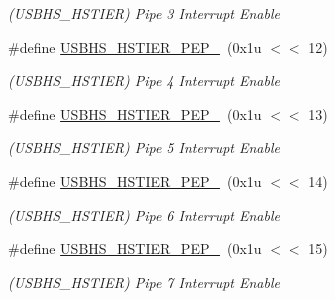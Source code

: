\begin{DoxyCompactItemize}
\begin{DoxyCompactList}\small\item\em (U\+S\+B\+H\+S\+\_\+\+H\+S\+T\+I\+ER) Pipe 3 Interrupt Enable \end{DoxyCompactList}\item 
\mbox{\label{group__SAMV71__USBHS_ga6c132fc69c3337e6671990fd1a7e991a}} 
\#define \mbox{\hyperlink{group__SAMV71__USBHS_ga6c132fc69c3337e6671990fd1a7e991a}{U\+S\+B\+H\+S\+\_\+\+H\+S\+T\+I\+E\+R\+\_\+\+P\+E\+P\+\_}}~(0x1u $<$$<$ 12)
\begin{DoxyCompactList}\small\item\em (U\+S\+B\+H\+S\+\_\+\+H\+S\+T\+I\+ER) Pipe 4 Interrupt Enable \end{DoxyCompactList}\item 
\mbox{\label{group__SAMV71__USBHS_ga6b87a486fa83e0611c5a4eb9d501f7b3}} 
\#define \mbox{\hyperlink{group__SAMV71__USBHS_ga6b87a486fa83e0611c5a4eb9d501f7b3}{U\+S\+B\+H\+S\+\_\+\+H\+S\+T\+I\+E\+R\+\_\+\+P\+E\+P\+\_}}~(0x1u $<$$<$ 13)
\begin{DoxyCompactList}\small\item\em (U\+S\+B\+H\+S\+\_\+\+H\+S\+T\+I\+ER) Pipe 5 Interrupt Enable \end{DoxyCompactList}\item 
\mbox{\label{group__SAMV71__USBHS_ga5e1680335266b023196d8eec97400876}} 
\#define \mbox{\hyperlink{group__SAMV71__USBHS_ga5e1680335266b023196d8eec97400876}{U\+S\+B\+H\+S\+\_\+\+H\+S\+T\+I\+E\+R\+\_\+\+P\+E\+P\+\_}}~(0x1u $<$$<$ 14)
\begin{DoxyCompactList}\small\item\em (U\+S\+B\+H\+S\+\_\+\+H\+S\+T\+I\+ER) Pipe 6 Interrupt Enable \end{DoxyCompactList}\item 
\mbox{\label{group__SAMV71__USBHS_ga788ce64d2afdf12459e1d2ae8899323d}} 
\#define \mbox{\hyperlink{group__SAMV71__USBHS_ga788ce64d2afdf12459e1d2ae8899323d}{U\+S\+B\+H\+S\+\_\+\+H\+S\+T\+I\+E\+R\+\_\+\+P\+E\+P\+\_}}~(0x1u $<$$<$ 15)
\begin{DoxyCompactList}\small\item\em (U\+S\+B\+H\+S\+\_\+\+H\+S\+T\+I\+ER) Pipe 7 Interrupt Enable \end{DoxyCompactList}\item 

\end{DoxyCompactItemize}
